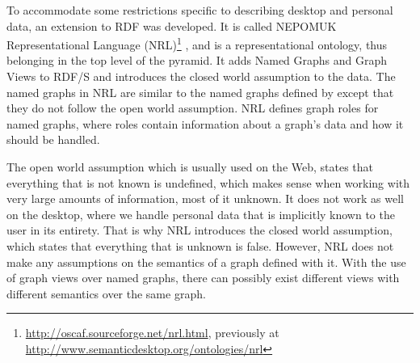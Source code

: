 To accommodate some restrictions specific to describing desktop and personal data, an extension to RDF was developed. It is called NEPOMUK Representational Language (NRL)\footnote{\url{http://oscaf.sourceforge.net/nrl.html}, previously at \url{http://www.semanticdesktop.org/ontologies/nrl}} \cite{Sintek2007}, and is a representational ontology, thus belonging in the top level of the pyramid. It adds Named Graphs and Graph Views to RDF/S and introduces the closed world assumption to the data. The named graphs in NRL are similar to the named graphs defined by \cite{Carroll2005} except that they do not follow the open world assumption. NRL defines graph roles for named graphs, where roles contain information about a graph's data and how it should be handled.

The open world assumption which is usually used on the Web, states that everything that is not known is undefined, which makes sense when working with very large amounts of information, most of it unknown. It does not work as well on the desktop, where we handle personal data that is implicitly known to the user in its entirety. That is why NRL introduces the closed world assumption, which states that everything that is unknown is false. However, NRL does not make any assumptions on the semantics of a graph defined with it. With the use of graph views over named graphs, there can possibly exist different views with different semantics over the same graph.

